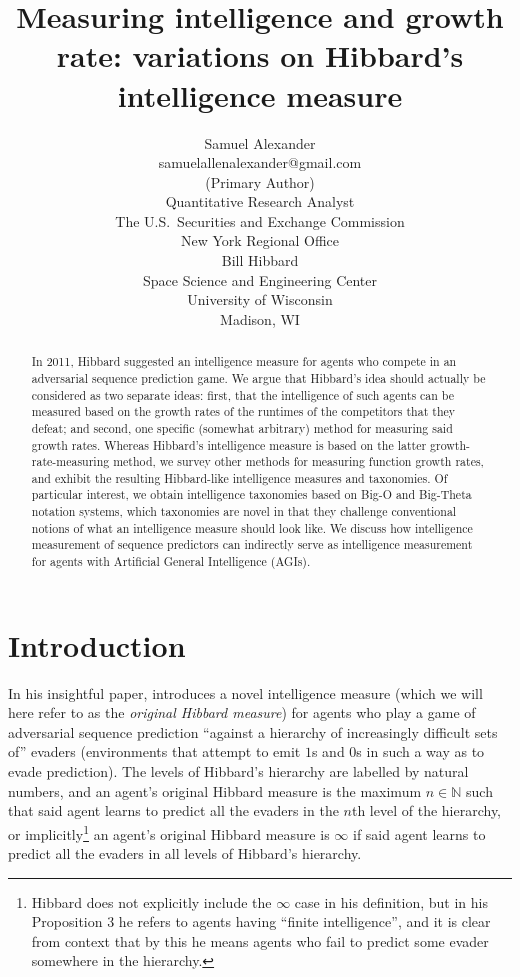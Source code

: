 \documentclass[twoside,11pt]{article}
\title{Measuring intelligence and growth rate: variations on
Hibbard's intelligence measure}
\author{\name Samuel Alexander \\
    \email samuelallenalexander@gmail.com \\
    \addr (Primary Author)\\
    Quantitative Research Analyst\\
    The U.S.\ Securities and Exchange Commission\\
    New York Regional Office\\
    \AND
    \name Bill Hibbard \\
    \addr Space Science and Engineering Center \\
    University of Wisconsin \\
    Madison, WI
}
\begin{document}
\maketitle

\begin{abstract}
    In 2011, Hibbard suggested an intelligence measure for agents
    who compete in an adversarial sequence prediction game. We argue
    that Hibbard's idea should actually be considered as two separate
    ideas: first, that the intelligence of such agents can be measured
    based on the growth rates of the runtimes of the competitors that
    they defeat; and second, one specific (somewhat arbitrary) method for measuring said
    growth rates. Whereas Hibbard's intelligence measure is based on the latter
    growth-rate-measuring method, we survey
    other methods for measuring function
    growth rates, and exhibit the resulting Hibbard-like intelligence measures
    and taxonomies. Of particular interest, we obtain intelligence taxonomies
    based on Big-O and Big-Theta notation systems, which taxonomies
    are novel in that they challenge conventional notions of what an
    intelligence measure should look like. We discuss how intelligence measurement
    of sequence predictors can indirectly serve as intelligence measurement for
    agents with Artificial General Intelligence (AGIs).
\end{abstract}

\section{Introduction}

In his insightful paper, \citet{hibbard} introduces a novel
intelligence measure (which we will here refer to as the \emph{original Hibbard measure})
for agents who play a game of adversarial sequence prediction
\citep{hibbard2008adversarial}
``against a hierarchy of increasingly difficult sets of'' evaders (environments that attempt
to emit $1$s and $0$s in such a way as to evade prediction).
The levels of Hibbard's hierarchy are labelled by natural numbers, and
an agent's original Hibbard measure is the maximum $n\in\mathbb N$ such that
said agent learns to predict all the evaders in the $n$th level of the hierarchy,
or implicitly\footnote{Hibbard does not explicitly include the $\infty$ case in his
definition, but in his Proposition 3 he refers to agents having ``finite intelligence'', and
it is clear from context that by this he means agents who fail to predict some evader
somewhere in the hierarchy.} an agent's original Hibbard measure is $\infty$
if said agent learns to predict all the evaders in all levels of Hibbard's hierarchy.
\end{document}
